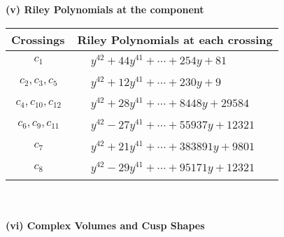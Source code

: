 \documentclass[1p]{elsarticle_modified}
\theoremstyle{definition}
\begin{document}
\newpage\renewcommand{\arraystretch}{1}
\flushleft \textbf{(v) Riley Polynomials at the component}\newline \\
\begin{tabular}{m{50pt}|m{274pt}}
Crossings & \hspace{64pt}Riley Polynomials at each crossing \\
\hline $$\begin{aligned}c_{1}\end{aligned}$$&$\begin{aligned}
&y^{42}+44 y^{41}+\cdots+254 y+81
\end{aligned}$\\
\hline $$\begin{aligned}c_{2},c_{3},c_{5}\end{aligned}$$&$\begin{aligned}
&y^{42}+12 y^{41}+\cdots+230 y+9
\end{aligned}$\\
\hline $$\begin{aligned}c_{4},c_{10},c_{12}\end{aligned}$$&$\begin{aligned}
&y^{42}+28 y^{41}+\cdots+8448 y+29584
\end{aligned}$\\
\hline $$\begin{aligned}c_{6},c_{9},c_{11}\end{aligned}$$&$\begin{aligned}
&y^{42}-27 y^{41}+\cdots+55937 y+12321
\end{aligned}$\\
\hline $$\begin{aligned}c_{7}\end{aligned}$$&$\begin{aligned}
&y^{42}+21 y^{41}+\cdots+383891 y+9801
\end{aligned}$\\
\hline $$\begin{aligned}c_{8}\end{aligned}$$&$\begin{aligned}
&y^{42}-29 y^{41}+\cdots+95171 y+12321
\end{aligned}$\\
\hline
\end{tabular}\\~\\
\newpage\flushleft \textbf{(vi) Complex Volumes and Cusp Shapes}
\end{document}
